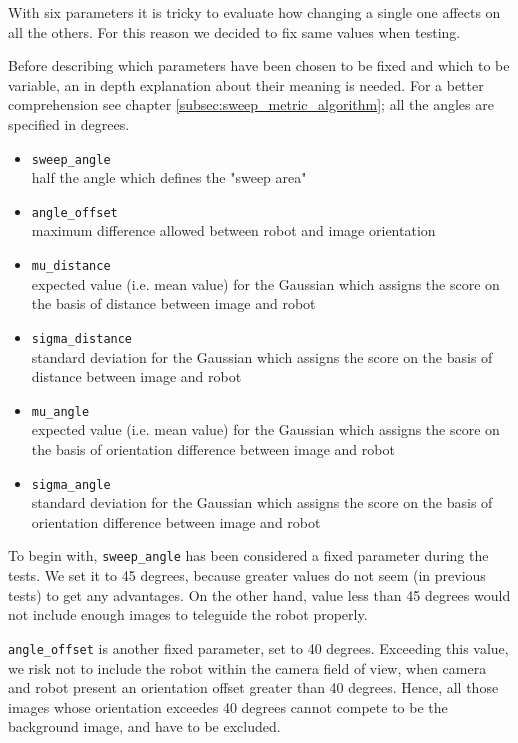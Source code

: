With six parameters it is tricky to evaluate how changing a single one affects on all the others. For this
reason we decided to fix same values when testing.
%

%
Before describing which parameters have been chosen to be fixed and which to be variable, an in depth explanation
about their meaning is needed. For a better comprehension see chapter \ref{subsec:sweep_metric_algorithm}; all
the angles are specified in degrees.

%
\begin{itemize}

  \item \texttt{sweep\_angle} \\
    half the angle which defines the "sweep area" 
  \item \texttt{angle\_offset} \\
    maximum difference allowed between robot and image orientation 

  \item \texttt{mu\_distance} \\
    expected value (i.e. mean value) for the Gaussian which assigns the score on the basis of distance between
    image and robot
  \item \texttt{sigma\_distance} \\
    standard deviation for the Gaussian which assigns the score on the basis of distance between image and robot

  \item \texttt{mu\_angle} \\
    expected value (i.e. mean value) for the Gaussian which assigns the score on the basis of orientation difference
    between image and robot
  \item \texttt{sigma\_angle} \\
    standard deviation for the Gaussian which assigns the score on the basis of orientation difference between image
    and robot

\end{itemize}
%

%
To begin with, \texttt{sweep\_angle} has been considered a fixed parameter during the tests. We set it to 45 degrees,
because greater values do not seem (in previous tests) to get any advantages. On the other hand, value less than 45
degrees would not include enough images to teleguide the robot properly.
%

%
\texttt{angle\_offset} is another fixed parameter, set to 40 degrees. Exceeding this value, we risk not to include
the robot within the camera field of view, when camera and robot present an orientation offset greater than 40 degrees.
Hence, all those images whose orientation exceedes 40 degrees cannot compete to be the background image, 
and have to be excluded.
%

